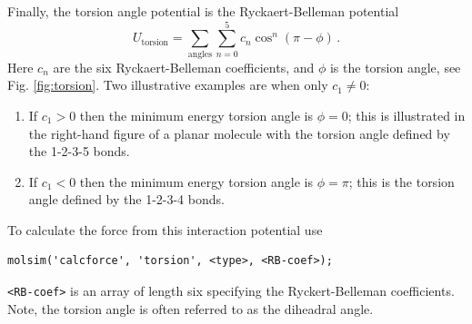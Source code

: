 \documentclass[11pt]{article}
\begin{document}
Finally, the torsion angle potential is the Ryckaert-Belleman potential 
\begin{equation}
  U_\mathrm{torsion}=\sum_{\mathrm{angles}} \sum_{n=0}^5 c_n
  \cos^n(\pi-\phi)
   \, . 
\end{equation}
Here $c_n$ are the six Ryckaert-Belleman coefficients, and $\phi$ is the
torsion angle, see Fig. \ref{fig:torsion}. Two illustrative 
examples are when only $c_1 \neq 0$:
\begin{enumerate}
\item If $c_1 > 0$ then the minimum energy torsion angle is $\phi = 0$; this is
  illustrated in the right-hand figure of a planar molecule with the torsion
  angle defined by the 1-2-3-5 bonds. 
\item If $c_1 < 0$ then the minimum energy torsion angle is $\phi = \pi$; this
  is the torsion angle defined by the 1-2-3-4 bonds. 
\end{enumerate}
To calculate the force from this interaction potential use
\begin{verbatim}
molsim('calcforce', 'torsion', <type>, <RB-coef>);
\end{verbatim}
\verb!<RB-coef>! is an array of length six specifying the Ryckert-Belleman
coefficients. Note, the torsion angle is often referred to as the diheadral angle. 
\end{document}
